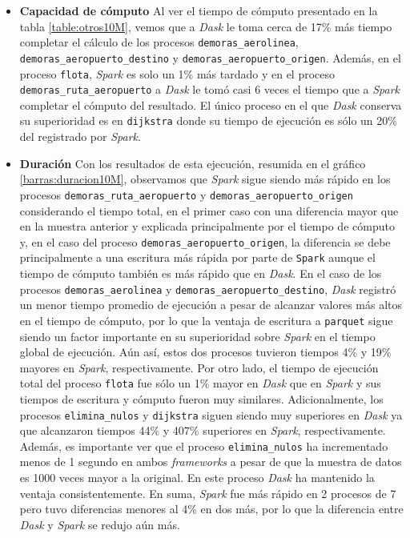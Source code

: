 \begin{itemize}
	\item \textbf{Capacidad de cómputo} Al ver el tiempo de cómputo presentado en la tabla \ref{table:otros10M}, vemos que a \textit{Dask} le toma cerca de 17\% más tiempo completar el cálculo de los procesos \texttt{demoras\_aerolinea}, \texttt{demoras\_aeropuerto\_destino} y \texttt{demoras\_aeropuerto\_origen}. Además, en el proceso \texttt{flota}, \textit{Spark} es solo un 1\% más tardado y en el proceso \texttt{demoras\_ruta\_aeropuerto} a \textit{Dask} le tomó casi 6 veces el tiempo que a \textit{Spark} completar el cómputo del resultado. El único proceso en el que \textit{Dask} conserva su superioridad es en \texttt{dijkstra} donde su tiempo de ejecución es sólo un 20\% del registrado por \textit{Spark}. 
	
	\item \textbf{Duración} Con los resultados de esta ejecución, resumida en el gráfico \ref{barras:duracion10M}, observamos que \textit{Spark} sigue siendo más rápido en los procesos \texttt{demoras\_ruta\_aeropuerto} y \texttt{demoras\_aeropuerto\_origen} considerando el tiempo total, en el primer caso con una diferencia mayor que en la muestra anterior y explicada principalmente por el tiempo de cómputo y, en el caso del proceso \texttt{demoras\_aeropuerto\_origen}, la diferencia se debe principalmente a una escritura más rápida por parte de \texttt{Spark} aunque el tiempo de cómputo también es más rápido que en \textit{Dask}. En el caso de los procesos \texttt{demoras\_aerolinea} y \texttt{demoras\_aeropuerto\_destino}, \textit{Dask} registró un menor tiempo promedio de ejecución a pesar de alcanzar valores más altos en el tiempo de cómputo, por lo que la ventaja de escritura a \texttt{parquet} sigue siendo un factor importante en su superioridad sobre \textit{Spark} en el tiempo global de ejecución. Aún así, estos dos procesos tuvieron tiempos 4\% y 19\% mayores en \textit{Spark}, respectivamente. Por otro lado, el tiempo de ejecución total del proceso \texttt{flota} fue sólo un 1\% mayor en \textit{Dask} que en \textit{Spark} y sus tiempos de escritura y cómputo fueron muy similares. Adicionalmente, los procesos \texttt{elimina\_nulos} y \texttt{dijkstra} siguen siendo muy superiores en \textit{Dask} ya que alcanzaron tiempos 44\% y 407\% superiores en \textit{Spark}, respectivamente. Además, es importante ver que el proceso \texttt{elimina\_nulos} ha incrementado menos de 1 segundo en ambos \textit{frameworks} a pesar de que la muestra de datos es 1000 veces mayor a la original. En este proceso \textit{Dask} ha mantenido la ventaja consistentemente. En suma, \textit{Spark} fue más rápido en 2 procesos de 7 pero tuvo diferencias menores al 4\% en dos más, por lo que la diferencia entre \textit{Dask} y \textit{Spark} se redujo aún más.

\end{itemize}


